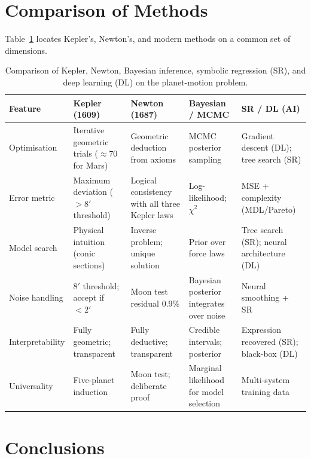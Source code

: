 \documentclass[12pt]{article}
\begin{document}
\section{Comparison of Methods}
\label{sec:comparison}

Table~\ref{tab:comparison} locates Kepler's, Newton's, and modern methods
on a common set of dimensions.

\begin{table}[h]
\centering
\renewcommand{\arraystretch}{1.3}
\caption{Comparison of Kepler, Newton, Bayesian inference, symbolic
  regression (SR), and deep learning (DL) on the planet-motion problem.}
\label{tab:comparison}
\begin{tabular}{@{}p{2.7cm}p{2.7cm}p{2.7cm}p{2.7cm}p{2.7cm}@{}}
\toprule
\textbf{Feature} & \textbf{Kepler (1609)} & \textbf{Newton (1687)}
  & \textbf{Bayesian / MCMC} & \textbf{SR / DL (AI)} \\
\midrule
Optimisation &
  Iterative geometric trials ($\approx70$ for Mars) &
  Geometric deduction from axioms &
  MCMC posterior sampling &
  Gradient descent (DL); tree search (SR) \\
Error metric &
  Maximum deviation ($>8'$ threshold) &
  Logical consistency with all three Kepler laws &
  Log-likelihood; $\chi^{2}$ &
  MSE + complexity (MDL/Pareto) \\
Model search &
  Physical intuition (conic sections) &
  Inverse problem; unique solution &
  Prior over force laws &
  Tree search (SR); neural architecture (DL) \\
Noise handling &
  $8'$ threshold; accept if $<2'$ &
  Moon test residual 0.9\% &
  Bayesian posterior integrates over noise &
  Neural smoothing + SR \\
Interpretability &
  Fully geometric; transparent &
  Fully deductive; transparent &
  Credible intervals; posterior &
  Expression recovered (SR); black-box (DL) \\
Universality &
  Five-planet induction &
  Moon test; deliberate proof &
  Marginal likelihood for model selection &
  Multi-system training data \\
\bottomrule
\end{tabular}
\end{table}

\section{Conclusions}
\end{document}
